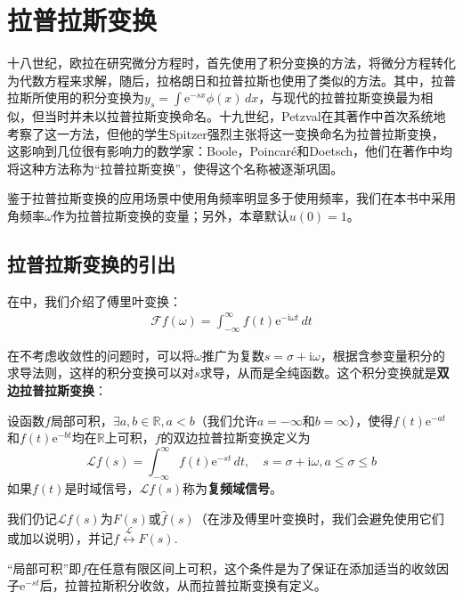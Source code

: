 \section{拉普拉斯变换}\label{sec:Laplace_Transform}

十八世纪，欧拉在研究微分方程时，首先使用了积分变换的方法，将微分方程转化为代数方程来求解，随后，拉格朗日和拉普拉斯也使用了类似的方法。其中，拉普拉斯所使用的积分变换为$y_s=\int \mathrm{e}^{-sx}\phi(x)\,dx$，与现代的拉普拉斯变换最为相似，但当时并未以拉普拉斯变换命名。十九世纪，Petzval在其著作中首次系统地考察了这一方法，但他的学生Spitzer强烈主张将这一变换命名为拉普拉斯变换，这影响到几位很有影响力的数学家：Boole，Poincaré和Doetsch，他们在著作中均将这种方法称为“拉普拉斯变换”，使得这个名称被逐渐巩固。


鉴于拉普拉斯变换的应用场景中使用角频率明显多于使用频率，我们在本书中采用角频率$\omega$作为拉普拉斯变换的变量；另外，本章默认$u(0)=1$。

\subsection{拉普拉斯变换的引出}\label{sub:introduction_of_laplace}
在中，我们介绍了傅里叶变换：\begin{align*}
    \mathcal{F} f(\omega)=\int_{-\infty}^{\infty}f(t)\mathrm{e}^{-\mathrm{i}\omega t}\,dt
\end{align*}

在不考虑收敛性的问题时，可以将$\omega$推广为复数$s=\sigma+\mathrm{i}\omega$，根据含参变量积分的求导法则，这样的积分变换可以对$s$求导，从而是全纯函数。这个积分变换就是\textbf{双边拉普拉斯变换}：
\begin{definition}[双边拉普拉斯变换]
    \label{def:bi_laplace}
    设函数$f$局部可积，$\exists a,b\in\mathbb{R},a<b$（我们允许$a=-\infty$和$b=\infty$），使得$f(t)\mathrm{e}^{-at}$和$f(t)\mathrm{e}^{-bt}$均在$\mathbb{R}$上可积，$f$的双边拉普拉斯变换定义为
    \[\mathcal{L}f(s)=\int_{-\infty}^{\infty}f(t)\mathrm{e}^{-st}\,dt,\quad s=\sigma+\mathrm{i}\omega,a\le \sigma\le b\]
    如果$f(t)$是时域信号，$\mathcal{L} f(s)$称为\textbf{复频域信号}。

    我们仍记$\mathcal{L} f(s)$为$F(s)$或$\hat{f}(s)$（在涉及傅里叶变换时，我们会避免使用它们或加以说明），并记$f\overset{\mathcal{L} }{\longleftrightarrow} F(s)$.
\end{definition}
“局部可积”即$f$在任意有限区间上可积，这个条件是为了保证在添加适当的收敛因子$\mathrm{e}^{-st}$后，拉普拉斯积分收敛，从而拉普拉斯变换有定义。

